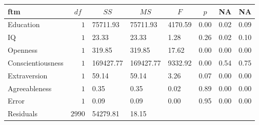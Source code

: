 \begin{table}[!tbp]
\begin{center}
\begin{tabular}{lrllllll}
\hline\hline
\multicolumn{1}{l}{ftm}&\multicolumn{1}{c}{$df$}&\multicolumn{1}{c}{$SS$}&\multicolumn{1}{c}{$MS$}&\multicolumn{1}{c}{$F$}&\multicolumn{1}{c}{$p$}&\multicolumn{1}{c}{NA}&\multicolumn{1}{c}{NA}\tabularnewline
\hline
Education&$   1$&75711.93&75711.93&4170.59&0.00&0.02&0.09\tabularnewline
IQ&$   1$&23.33&23.33&1.28&0.26&0.02&0.10\tabularnewline
Openness&$   1$&319.85&319.85&17.62&0.00&0.00&0.00\tabularnewline
Conscientiousness&$   1$&169427.77&169427.77&9332.92&0.00&0.54&0.75\tabularnewline
Extraversion&$   1$&59.14&59.14&3.26&0.07&0.00&0.00\tabularnewline
Agreeableness&$   1$&0.35&0.35&0.02&0.89&0.00&0.00\tabularnewline
Error&$   1$&0.09&0.09&0.00&0.95&0.00&0.00\tabularnewline
Residuals&$2990$&54279.81&18.15&&&&\tabularnewline
\hline
\end{tabular}\end{center}

\end{table}
